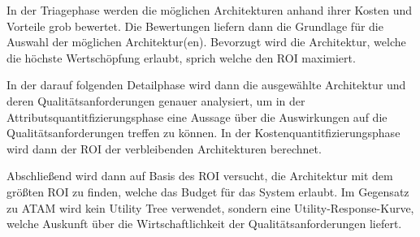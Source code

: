 In der Triagephase werden die möglichen Architekturen anhand ihrer Kosten und Vorteile grob bewertet. Die Bewertungen liefern dann die Grundlage für die Auswahl der möglichen Architektur(en). Bevorzugt wird die Architektur, welche die höchste Wertschöpfung erlaubt, sprich welche den ROI maximiert. \cite[S. 68]{review}

In der darauf folgenden Detailphase wird dann die ausgewählte Architektur und deren Qualitätsanforderungen genauer analysiert, um in der Attributsquantitfizierungsphase eine Aussage über die Auswirkungen auf die Qualitätsanforderungen treffen zu können. In der Kostenquantitfizierungsphase wird dann der ROI der verbleibenden Architekturen berechnet. \cite[S. 68-69]{review}

Abschließend wird dann auf Basis des ROI versucht, die Architektur mit dem größten ROI zu finden, welche das Budget für das System erlaubt. Im Gegensatz zu ATAM wird kein Utility Tree verwendet, sondern eine \glqq Utility-Response-Kurve\grqq, welche Auskunft über die Wirtschaftlichkeit der Qualitätsanforderungen liefert.  \cite[S. 69]{review}